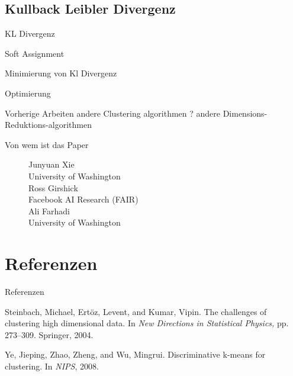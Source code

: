 \documentclass{beamer}
\begin{document}
\subsection{Kullback Leibler Divergenz}
\begin{frame}[t]{KL Divergenz}\vspace{4pt}

\end{frame}

\begin{frame}[t]{Soft Assignment}\vspace{4pt}

\end{frame}

\begin{frame}[t]{Minimierung von Kl Divergenz}\vspace{4pt}

\end{frame}

\begin{frame}[t]{Optimierung}\vspace{4pt}

\end{frame}

\begin{frame}[t]{Vorherige Arbeiten}\vspace{4pt}
andere Clustering algorithmen ?
andere Dimensions-Reduktions-algorithmen
\end{frame}

\begin{frame}[t]{Von wem ist das Paper}\vspace{30pt}

\begin{figure}
\center
\Large{Junyuan Xie}\\
University of Washington\\
\vspace{8pt}
\Large{Ross Girshick}\\
Facebook AI Research (FAIR)\\
\vspace{8pt}
\Large{Ali Farhadi}\\
University of Washington\\
\end{figure}

\end{frame}


\section{Referenzen}
\begin{frame}[t]{Referenzen}\vspace{4pt}
\begin{thebibliography}{10}
Steinbach, Michael, Ertöz, Levent, and Kumar, Vipin.
The challenges of clustering high dimensional data. In
\textit{New Directions in Statistical Physics,} pp. 273–309. Springer, 2004.

Ye, Jieping, Zhao, Zheng, and Wu, Mingrui. Discriminative k-means for clustering. In \textit{NIPS}, 2008.
\end{thebibliography}

\end{frame}
\end{document}
